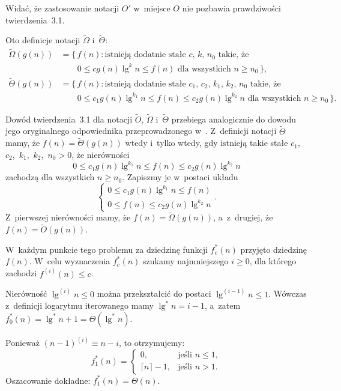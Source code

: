 Widać, że zastosowanie notacji $O'$ w~miejsce $O$ nie pozbawia prawdziwości twierdzenia~3.1.

\subproblem %
Oto definicje notacji $\widetilde{\Omega}$ i~$\widetilde{\Theta}$:
\[
	\begin{split}
		\widetilde{\Omega}(g(n)) &= \bigl\{\,f(n):\text{istnieją dodatnie stałe $c$,~$k$,~$n_0$ takie, że} \\
		&\qquad 0 \le cg(n)\lg^kn \le f(n) \text{ dla wszystkich $n \ge n_0$}\,\bigr\}, \\
		\widetilde{\Theta}(g(n)) &= \bigl\{\,f(n):\text{istnieją dodatnie stałe $c_1$,~$c_2$,~$k_1$,~$k_2$,~$n_0$ takie, że} \\
		&\qquad 0 \le c_1g(n)\lg^{k_1}n \le f(n) \le c_2g(n)\lg^{k_2}n \text{ dla wszystkich $n \ge n_0$}\,\bigr\}.
	\end{split}
\]

Dowód twierdzenia~3.1 dla notacji $\widetilde{O}$, $\widetilde{\Omega}$ i~$\widetilde{\Theta}$ przebiega analogicznie do dowodu jego oryginalnego odpowiednika przeprowadzonego w~. Z~definicji notacji $\widetilde{\Theta}$ mamy, że $f(n)=\widetilde{\Theta}(g(n))$ wtedy i~tylko wtedy, gdy istnieją takie stałe $c_1$,~$c_2$,~$k_1$,~$k_2$,~$n_0>0$, że nierówności
\[
	0 \le c_1g(n)\lg^{k_1}n \le f(n) \le c_2g(n)\lg^{k_2}n
\]
zachodzą dla wszystkich $n\ge n_0$. Zapiszmy je w~postaci układu
\[
	\begin{cases}
		0 \le c_1g(n)\lg^{k_1}n \le f(n) \\
		0 \le f(n) \le c_2g(n)\lg^{k_2}n
	\end{cases}.
\]
Z~pierwszej nierówności mamy, że $f(n)=\widetilde{\Omega}(g(n))$, a~z~drugiej, że $f(n)=\widetilde{O}(g(n))$.

W~każdym punkcie tego problemu za dziedzinę funkcji $f_c^*(n)$ przyjęto dziedzinę $f(n)$. W~celu wyznaczenia $f_c^*(n)$ szukamy najmniejszego $i\ge0$, dla którego zachodzi $f^{(i)}(n)\le c$.

\subproblem %
Nierówność $\lg^{(i)}n\le0$ można przekształcić do postaci $\lg^{(i-1)}n\le1$. Wówczas z~definicji logarytmu iterowanego mamy $\lg^*n=i-1$, a~zatem $f_0^*(n)=\lg^*n+1=\Theta(\lg^*n)$.

\subproblem %
Ponieważ $(n-1)^{(i)}\equiv n-i$, to otrzymujemy:
\[
	f_1^*(n) =
	\begin{cases}
		0, & \text{jeśli $n\le1$}, \\
		\lceil n\rceil-1, & \text{jeśli $n>1$}.
	\end{cases}
\]
Oszacowanie dokładne: $f_1^*(n)=\Theta(n)$.

